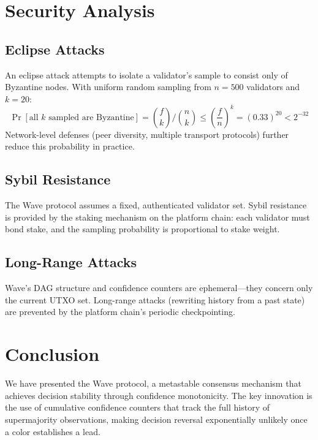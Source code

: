 \documentclass[11pt,a4paper]{article}
\begin{document}
\section{Security Analysis}
\label{sec:security}

\subsection{Eclipse Attacks}

An eclipse attack attempts to isolate a validator's sample to consist only of Byzantine
nodes. With uniform random sampling from $n = 500$ validators and $k = 20$:
\[
\Pr[\text{all } k \text{ sampled are Byzantine}] = \binom{f}{k} / \binom{n}{k}
\leq \left(\frac{f}{n}\right)^k = (0.33)^{20} < 2^{-32}
\]
Network-level defenses (peer diversity, multiple transport protocols) further reduce this
probability in practice.

\subsection{Sybil Resistance}

The Wave protocol assumes a fixed, authenticated validator set. Sybil resistance is
provided by the staking mechanism on the platform chain: each validator must bond
stake, and the sampling probability is proportional to stake weight.

\subsection{Long-Range Attacks}

Wave's DAG structure and confidence counters are ephemeral---they concern only the
current UTXO set. Long-range attacks (rewriting history from a past state) are prevented
by the platform chain's periodic checkpointing.

\section{Conclusion}
\label{sec:conclusion}

We have presented the Wave protocol, a metastable consensus mechanism that achieves
decision stability through confidence monotonicity. The key innovation is the use of
cumulative confidence counters that track the full history of supermajority observations,
making decision reversal exponentially unlikely once a color establishes a lead.
\end{document}

